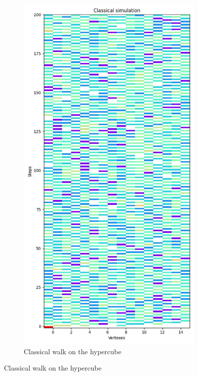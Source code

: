\begin{figure}[H]
  \centering
  \begin{subfigure}{.45\linewidth}
    \centering
    \includegraphics[width=\linewidth]{./figures/results/hypercube/classical.jpg}
    \caption{Classical walk on the hypercube}

\end{subfigure}
\end{figure}
